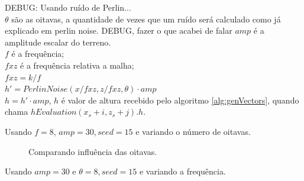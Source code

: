 DEBUG: Usando ruído de Perlin...\\
$\theta$ são as oitavas, a quantidade de vezes que um ruído será calculado 
como já explicado em perlin noise. DEBUG, fazer o que acabei de falar
$amp$ é a amplitude escalar do terreno.\\
$f$ é a frequência;\\
$fxz$ é a frequência relativa a malha;\\
$fxz = k/f$\\
$h' = PerlinNoise(x/fxz, z/fxz, \theta) \cdot amp$\\
$h = h' \cdot amp$, $h$ é valor de altura recebido pelo algoritmo \ref{alg:genVectors}, quando chama $hEvaluation(x_{s} + i, z_{s} + j).h$.

Usando $f = 8$, $amp = 30, seed = 15$ e variando o número de oitavas.

\begin{figure}[H]
     \centering
     \hspace{0.1cm}
     \hspace{0.1cm}
     \caption{Comparando influência das oitavas.}
     \label{fig:parametrosOctaves}
\end{figure}

Usando $amp = 30$ e $\theta = 8, seed = 15$ e variando a frequência.

